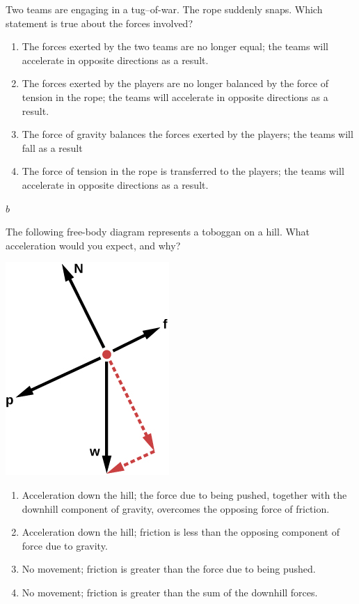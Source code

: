 \documentclass[
]{book}
\providecommand{\tightlist}{%
  \setlength{\itemsep}{0pt}\setlength{\parskip}{0pt}}
\newenvironment{ap-test-prep}{}{}
\begin{document}
\begin{ap-test-prep}
\hypertarget{fs-id1349141}{}
\leavevmode\hypertarget{fs-id1899137}{}%
Two teams are engaging in a tug--of-war. The rope suddenly snaps. Which
statement is true about the forces involved?

\begin{enumerate}
\def\labelenumi{\alph{enumi}.}
\tightlist
\item
  The forces exerted by the two teams are no longer equal; the teams
  will accelerate in opposite directions as a result.
\item
  The forces exerted by the players are no longer balanced by the
  force of tension in the rope; the teams will accelerate in opposite
  directions as a result.
\item
  The force of gravity balances the forces exerted by the players; the
  teams will fall as a result
\item
  The force of tension in the rope is transferred to the players; the
  teams will accelerate in opposite directions as a result.
\end{enumerate}

\leavevmode\hypertarget{fs-id1640120}{}%
\(b\)

\hypertarget{fs-id1624568}{}
\leavevmode\hypertarget{fs-id1891367}{}%
The following free-body diagram represents a toboggan on a hill. What
acceleration would you expect, and why?

\includegraphics{images/Figure_04_05_12.jpg}

\begin{enumerate}
\def\labelenumi{\alph{enumi}.}
\tightlist
\item
  Acceleration down the hill; the force due to being pushed, together
  with the downhill component of gravity, overcomes the opposing force
  of friction.
\item
  Acceleration down the hill; friction is less than the opposing
  component of force due to gravity.
\item
  No movement; friction is greater than the force due to being pushed.
\item
  No movement; friction is greater than the sum of the downhill
  forces.
\end{enumerate}


\end{ap-test-prep}
\end{document}
